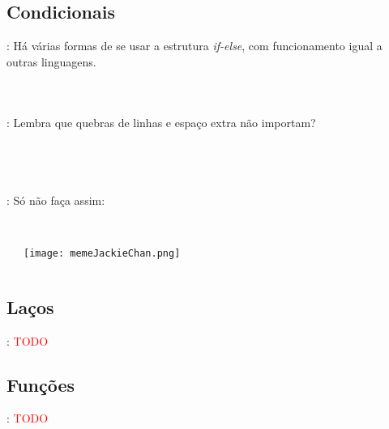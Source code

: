 \subsection{Condicionais}


\begin{frame}{\insertsection: \insertsubsection}
  Há várias formas de se usar a estrutura \textit{if-else}, com funcionamento igual a outras linguagens.
  \begin{columns}[t]
    \inputminted[firstline=1,lastline=3]{arduino}{sketches/introLinguagem/.condicionais.ino}
    \inputminted[firstline=1,lastline=6]{arduino}{sketches/introLinguagem/.condicionais.ino}
    \inputminted[firstline=8,lastline=16]{arduino}{sketches/introLinguagem/.condicionais.ino}
  \end{columns}
\end{frame}


\begin{frame}{\insertsection: \insertsubsection}
  Lembra que quebras de linhas e espaço extra não importam?
  \begin{columns}[t]
    \inputminted[firstline=1,lastline=6]{arduino}{sketches/introLinguagem/.condicionais.ino}\vspace{-\bigskipamount}\\
    \inputminted[firstline=18,lastline=22]{arduino}{sketches/introLinguagem/.condicionais.ino}
    \inputminted[firstline=24,lastline=31]{arduino}{sketches/introLinguagem/.condicionais.ino}
    \inputminted[firstline=33,lastline=39]{arduino}{sketches/introLinguagem/.condicionais.ino}
  \end{columns}
\end{frame}


\begin{frame}{\insertsection: \insertsubsection}
  Só não faça assim:
  \begin{columns}[t]
    \inputminted[firstline=41,lastline=41]{arduino}{sketches/introLinguagem/.condicionais.ino}\\
    \texttt{[image: memeJackieChan.png]}
    \inputminted[firstline=43,lastline=52]{arduino}{sketches/introLinguagem/.condicionais.ino}
  \end{columns}
\end{frame}


\subsection{Laços}


\begin{frame}{\insertsection: \insertsubsection}
  \textcolor{red}{TODO}
\end{frame}


\subsection{Funções}


\begin{frame}{\insertsection: \insertsubsection}
  \textcolor{red}{TODO}
\end{frame}
